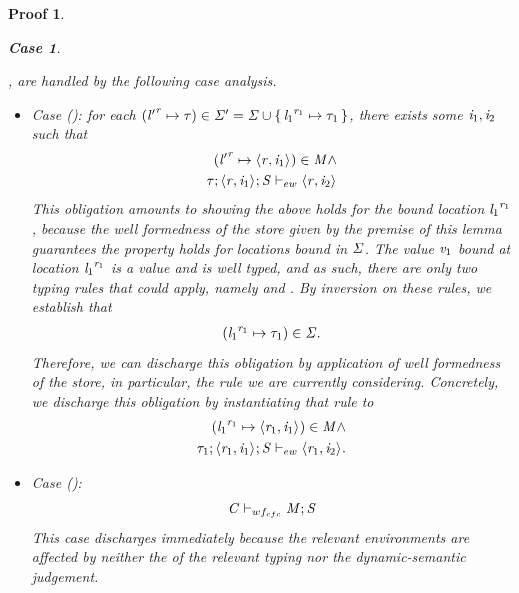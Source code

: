 \documentclass[showabstract,showacknowledgments,showpreface,showdedication]{iuphd}
\newtheorem*{bcase}{Case}
\theoremstyle{nonumberplain}
\newtheorem{nproof}{Proof}
\begin{document}
\begin{nproof}
\begin{bcase}
\begin{itemize}
        ,
        are handled by the following case analysis.
    \begin{itemize}
      \item
      Case ():
      for each $({\mathit{l}'}^{\mathit{r}} \mapsto \mathit{\tau}) \in \mathit{\Sigma}' = \mathit{\Sigma} \cup \{ \, {\mathit{l}_1}^{\mathit{r}_1} \mapsto \mathit{\tau}_1 \,\}$, there exists some $\mathit{i}_1, \mathit{i}_2$ such that
      \begin{align*}
      ({\mathit{l}'}^{\mathit{r}} \mapsto \langle \mathit{r}, \mathit{i}_1 \rangle ^{}) \in \mathit{M} \wedge \\
        \mathit{\tau};\langle \mathit{r}, \mathit{i}_1 \rangle ^{};\mathit{S} \vdash_{ew} \langle \mathit{r}, \mathit{i}_2 \rangle ^{} 
      \end{align*}
      This obligation amounts to showing the above holds for the bound location
      ${\mathit{l}_1}^{\mathit{r}_1}$, because the well formedness of the
      store given by the premise of this lemma guarantees the property
      holds for locations bound in $\mathit{\Sigma}$.
      The value $\mathit{v}_1$ bound at location ${\mathit{l}_1}^{\mathit{r}_1}$ is
      a value and is well typed, and as such, there are only two typing
      rules that could apply, namely \tvar{} and \tconcreteloc{}.
      By inversion on these rules, we establish that
      \begin{align*}
      ({\mathit{l}_1}^{\mathit{r}_1} \mapsto \mathit{\tau}_1) \in \mathit{\Sigma}.
      \end{align*}
      Therefore, we can discharge this obligation by application of well formedness of the
      store, in particular, the rule
       we
      are currently considering.
      Concretely, we discharge this obligation by instantiating that rule to
      \begin{align*}
      ({\mathit{l}_1}^{\mathit{r}_1} \mapsto \langle \mathit{r}_1, \mathit{i}_1 \rangle ^{}) \in \mathit{M} \wedge \\
        \mathit{\tau}_1;\langle \mathit{r}_1, \mathit{i}_1 \rangle ^{};\mathit{S} \vdash_{ew} \langle \mathit{r}_1, \mathit{i}_2 \rangle ^{}.
      \end{align*}
      \item Case ():
      \begin{align*}
      \mathit{C} \vdash_{wf_{cfc}} \mathit{M};\mathit{S}
      \end{align*}
      This case discharges immediately because the relevant environments
      are affected by neither the of the relevant typing nor the dynamic-semantic judgement.

\end{itemize}
\end{itemize}
\end{bcase}
\end{nproof}
\end{document}

